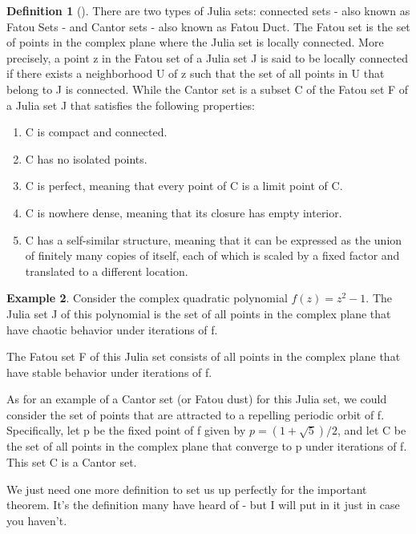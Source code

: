 \documentclass[a4paper,11pt]{article}
\theoremstyle{definition}
\newtheorem{defn}{Definition}[section] %
\newtheorem{exmp}[defn]{Example}
\numberwithin{equation}{section} %
\begin{document}
\begin{defn}[\cite{defn-of-fatou-sets-dust}]
    There are two types of Julia sets: connected sets - also known as Fatou Sets - and Cantor sets - also known as Fatou Duct.
    The Fatou set is the set of points in the complex plane where the Julia set is locally connected. More precisely, a point z in the Fatou set of a Julia set J is said to be locally connected if there exists a neighborhood U of z such that the set of all points in U that belong to J is connected.
    While the Cantor set is a subset C of the Fatou set F of a Julia set J that satisfies the following properties:
    \begin{enumerate}
        \item C is compact and connected.
        \item C has no isolated points.
        \item C is perfect, meaning that every point of C is a limit point of C.
        \item C is nowhere dense, meaning that its closure has empty interior.
        \item C has a self-similar structure, meaning that it can be expressed as the union of finitely many copies of itself, each of which is scaled by a fixed factor and translated to a different location.
    \end{enumerate}

\end{defn}

\begin{exmp}
    Consider the complex quadratic polynomial $f(z) = z^2 - 1$. The Julia set J of this polynomial is the set of all points in the complex plane that have chaotic behavior under iterations of f.

    The Fatou set F of this Julia set consists of all points in the complex plane that have stable behavior under iterations of f.

    As for an example of a Cantor set (or Fatou dust) for this Julia set, we could consider the set of points that are attracted to a repelling periodic orbit of f. Specifically, let p be the fixed point of f given by $p = (1 + \sqrt{5})/2$, and let C be the set of all points in the complex plane that converge to p under iterations of f. This set C is a Cantor set.
\end{exmp}

We just need one more definition to set us up perfectly for the important theorem. It's the definition many have heard of - but I will put in it just in case you haven't.
\end{document}
